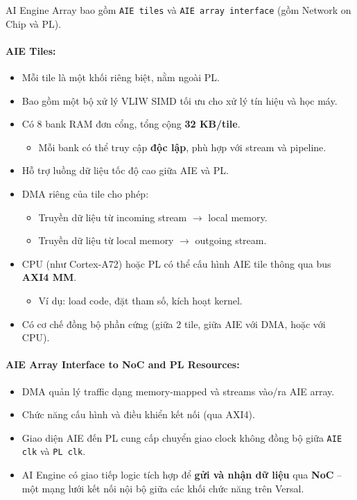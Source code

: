 AI Engine Array bao gồm \texttt{AIE tiles} và \texttt{AIE array interface} (gồm Network on Chip và PL).

\paragraph{AIE Tiles:}
\begin{itemize}
    \item Mỗi tile là một khối riêng biệt, nằm ngoài PL.
    \item Bao gồm một bộ xử lý VLIW SIMD tối ưu cho xử lý tín hiệu và học máy.
    \item Có 8 bank RAM đơn cổng, tổng cộng \textbf{32 KB/tile}. 
    \begin{itemize}
        \item Mỗi bank có thể truy cập \textbf{độc lập}, phù hợp với stream và pipeline.
    \end{itemize}
    \item Hỗ trợ luồng dữ liệu tốc độ cao giữa AIE và PL.
    \item DMA riêng của tile cho phép:
    \begin{itemize}
        \item Truyền dữ liệu từ incoming stream $\rightarrow$ local memory.
        \item Truyền dữ liệu từ local memory $\rightarrow$ outgoing stream.
    \end{itemize}
    \item CPU (như Cortex-A72) hoặc PL có thể cấu hình AIE tile thông qua bus \textbf{AXI4 MM}.
    \begin{itemize}
        \item Ví dụ: load code, đặt tham số, kích hoạt kernel.
    \end{itemize}
    \item Có cơ chế đồng bộ phần cứng (giữa 2 tile, giữa AIE với DMA, hoặc với CPU).
\end{itemize}

\paragraph{AIE Array Interface to NoC and PL Resources:}
\begin{itemize}
    \item DMA quản lý traffic dạng memory-mapped và streams vào/ra AIE array.
    \item Chức năng cấu hình và điều khiển kết nối (qua AXI4).
    \item Giao diện AIE đến PL cung cấp chuyển giao clock không đồng bộ giữa \texttt{AIE clk} và \texttt{PL clk}.
    \item AI Engine có giao tiếp logic tích hợp để \textbf{gửi và nhận dữ liệu} qua \textbf{NoC} -- một mạng lưới kết nối nội bộ giữa các khối chức năng trên Versal.
\end{itemize}

